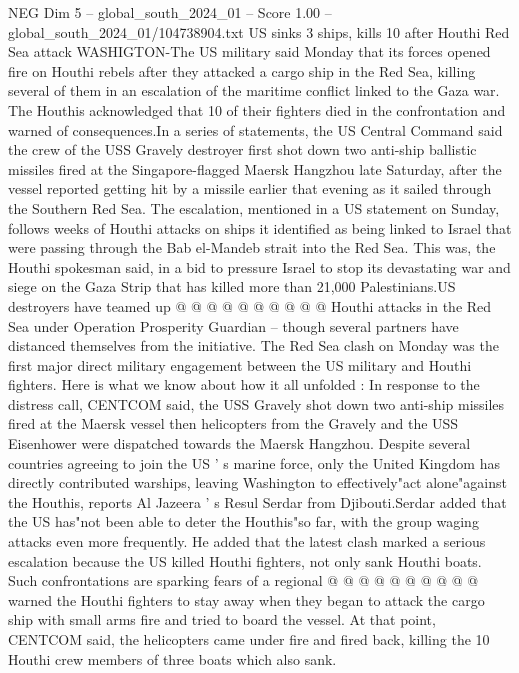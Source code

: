 \begin{textsample}{NEG Dim 5 – global\_south\_2024\_01 – Score 1.00 – global\_south\_2024\_01/104738904.txt}  \label{ex:f5_neg_434}
US sinks 3 ships, kills 10 after Houthi Red Sea attack WASHIGTON-The US military said Monday that its forces opened fire on Houthi rebels after they attacked a cargo ship in the Red Sea, killing several of them in an escalation of the maritime conflict linked to the Gaza war.
The Houthis acknowledged that 10 of their fighters died in the confrontation and warned of consequences.In a series of statements, the US Central Command said the crew of the USS Gravely destroyer first shot down two anti-ship ballistic missiles fired at the Singapore-flagged Maersk Hangzhou late Saturday, after the vessel reported getting hit by a missile earlier that evening as it sailed through the Southern Red Sea.
The escalation, mentioned in a US statement on Sunday, follows weeks of Houthi attacks on ships it identified as being linked to Israel that were passing through the Bab el-Mandeb strait into the Red Sea.
This was, the Houthi spokesman said, in a bid to pressure Israel to stop its devastating war and siege on the Gaza Strip that has killed more than 21,000 Palestinians.US destroyers have teamed up @ @ @ @ @ @ @ @ @ @ Houthi attacks in the Red Sea under Operation Prosperity Guardian -- though several partners have distanced themselves from the initiative.
The Red Sea clash on Monday was the first major direct military engagement between the US military and Houthi fighters.
Here is what we know about how it all unfolded : In response to the distress call, CENTCOM said, the USS Gravely shot down two anti-ship missiles fired at the Maersk vessel then helicopters from the Gravely and the USS Eisenhower were dispatched towards the Maersk Hangzhou.
Despite several countries agreeing to join the US ' s marine force, only the United Kingdom has directly contributed warships, leaving Washington to effectively"act alone"against the Houthis, reports Al Jazeera ' s Resul Serdar from Djibouti.Serdar added that the US has"not been able to deter the Houthis"so far, with the group waging attacks even more frequently.
He added that the latest clash marked a serious escalation because the US killed Houthi fighters, not only sank Houthi boats.
Such confrontations are sparking fears of a regional @ @ @ @ @ @ @ @ @ @ warned the Houthi fighters to stay away when they began to attack the cargo ship with small arms fire and tried to board the vessel.
At that point, CENTCOM said, the helicopters came under fire and fired back, killing the 10 Houthi crew members of three boats which also sank.

\end{textsample}
